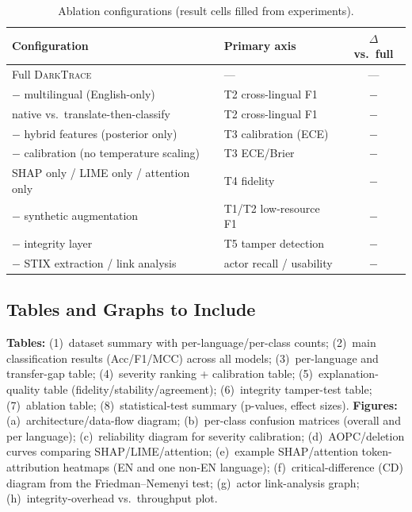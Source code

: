 \documentclass[11pt,a4paper]{article}
\newcommand{\framework}{\textsc{DarkTrace}}
\begin{document}
\begin{table}[t]
\centering
\caption{Ablation configurations (result cells filled from experiments).}
\label{tab:method-ablation}
\small
\renewcommand{\arraystretch}{1.15}
\begin{tabular}{@{}p{6.0cm}p{4.2cm}c@{}}
\toprule
\textbf{Configuration} & \textbf{Primary axis} & \textbf{$\Delta$ vs.\ full} \\
\midrule
Full \framework{}                              & ---                       & --- \\
$-$ multilingual (English-only)                & T2 cross-lingual F1       & \emph{$-$} \\
\;native vs.\ translate-then-classify          & T2 cross-lingual F1       & \emph{$-$} \\
$-$ hybrid features (posterior only)           & T3 calibration (ECE)      & \emph{$-$} \\
$-$ calibration (no temperature scaling)       & T3 ECE/Brier              & \emph{$-$} \\
SHAP only / LIME only / attention only         & T4 fidelity               & \emph{$-$} \\
$-$ synthetic augmentation                     & T1/T2 low-resource F1     & \emph{$-$} \\
$-$ integrity layer                            & T5 tamper detection       & \emph{$-$} \\
$-$ STIX extraction / link analysis            & actor recall / usability  & \emph{$-$} \\
\bottomrule
\end{tabular}
\end{table}

\subsection{Tables and Graphs to Include}\label{sec:method-figs}
\textbf{Tables:} (1)~dataset summary with per-language/per-class counts; (2)~main
classification results (Acc/F1/MCC) across all models; (3)~per-language and transfer-gap
table; (4)~severity ranking + calibration table; (5)~explanation-quality table
(fidelity/stability/agreement); (6)~integrity tamper-test table; (7)~ablation table;
(8)~statistical-test summary (p-values, effect sizes).
\textbf{Figures:} (a)~architecture/data-flow diagram; (b)~per-class confusion matrices
(overall and per language); (c)~reliability diagram for severity calibration;
(d)~AOPC/deletion curves comparing SHAP/LIME/attention; (e)~example SHAP/attention
token-attribution heatmaps (EN and one non-EN language); (f)~critical-difference (CD)
diagram from the Friedman--Nemenyi test; (g)~actor link-analysis graph;
(h)~integrity-overhead vs.\ throughput plot.
\end{document}
